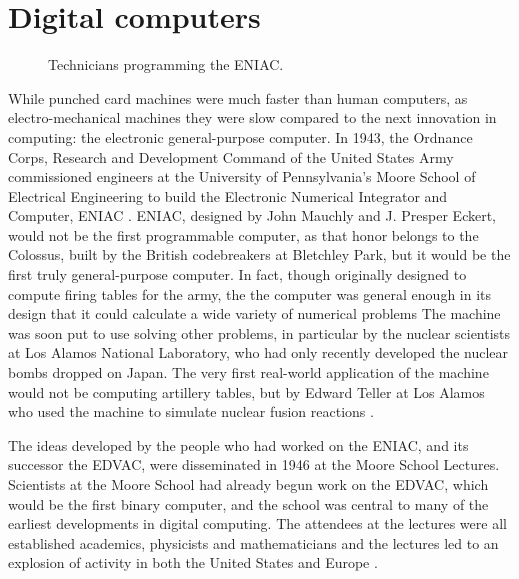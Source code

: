 \documentclass[\rootfolder/main.tex]{subfiles}
\begin{document}
\section{Digital computers}

\begin{figure}[ht]
    \caption{Technicians programming the ENIAC.}
    \label{fig:eniac}
\end{figure}

While punched card machines were much faster than human computers, as electro-mechanical machines they were slow compared to the next innovation in computing: the electronic general-purpose computer.
In 1943, the Ordnance Corps, Research and Development Command of the United States Army commissioned engineers at the University of Pennsylvania's Moore School of Electrical Engineering
to build the Electronic Numerical Integrator and Computer, ENIAC \cite{sep-computing-history}\cite{reed1952}.
ENIAC, designed by John Mauchly and J. Presper Eckert, would not be the first programmable computer, as that honor belongs to the Colossus,
built by the British codebreakers at Bletchley Park\cite{winegrad1996}, but it would be the first truly general-purpose computer.
In fact, though originally designed to compute firing tables for the army, the the computer was general enough in its design that it could calculate a wide variety of numerical problems \cite{10.2307/2002620}
The machine was soon put to use solving other problems, in particular by the nuclear scientists at Los Alamos National Laboratory, who had only recently developed the nuclear bombs dropped on Japan.
The very first real-world application of the machine would not be computing artillery tables, but by Edward Teller at Los Alamos who used the machine to simulate nuclear fusion reactions \cite{AtomicHeritageFoundation}.

The ideas developed by the people who had worked on the ENIAC, and its successor the EDVAC, were disseminated in 1946 at the Moore School Lectures.
Scientists at the Moore School had already begun work on the EDVAC, which would be the first binary computer,
and the school was central to many of the earliest developments in digital computing.
The attendees at the lectures were all established academics, physicists and mathematicians and the lectures led to an explosion of activity in both the United States and Europe \cite{Davis2008}.
\end{document}
